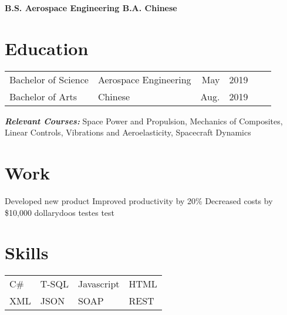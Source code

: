 \documentclass[letterpaper,11pt]{cv_format}
\begin{document}
\textbf{\centering B.S. Aerospace Engineering \hspace{1cm}\textperiodcentered\hspace{1cm}  B.A. Chinese\\}


\section{Education}

\vspace{-2em}
\begin{adjustwidth}{10em}{0em}
\begin{longtable}{p{.2\linewidth} p{.838\linewidth} rp{.05\linewidth} rp{.15\linewidth}}
Bachelor of Science & Aerospace Engineering & May & 2019 \\
Bachelor of Arts  & Chinese & Aug. & 2019
\end{longtable}
\end{adjustwidth}
\vspace{-2em}
\textbf{\emph{Relevant Courses:}} Space Power and Propulsion, Mechanics of Composites, Linear Controls, Vibrations and Aeroelasticity, Spacecraft Dynamics

\section{Work}
\workitems
{Developed new product}
{Improved productivity by 20\%}
{Decreased costs by \$10,000 dollarydoos}
{testes}
 test

\section{Skills}
\begin{tabular}{l l l l}
C\# & T-SQL & Javascript & HTML \\
XML & JSON & SOAP & REST
\end{tabular}
 
\end{document}
